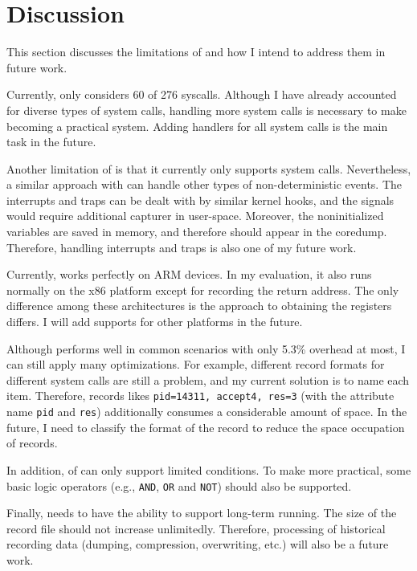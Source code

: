 \section{Discussion} \label{sec:discussion} 

This section discusses the limitations of \TheName and how I intend to address them in future work.

Currently, \TheName only considers 60 of 276 syscalls. Although I have already accounted for diverse types of system calls, handling more system calls is necessary to make \TheName becoming a practical system. Adding handlers for all system calls is the main task in the future.

Another limitation of \TheName is that it currently only supports system calls. Nevertheless, a similar approach with \TheName can handle other types of non-deterministic events. The
interrupts and traps can be dealt with by similar kernel hooks, and the signals
would require additional capturer in user-space. Moreover, the noninitialized variables are saved in memory, and therefore should appear in the coredump. Therefore, handling interrupts and traps is also one of my future work.

Currently, \TheName works perfectly on ARM devices. In my evaluation, it also runs normally on the x86 platform except for recording the return address. The only difference among these architectures is the approach to obtaining the registers differs. I will add supports for other platforms in the future.

Although \TheName performs well in common scenarios with only 5.3\% overhead at most, I can still apply many optimizations. For example, different record formats for different system calls are still a problem, and my current solution is to name each item. Therefore, records likes \texttt{pid=14311, accept4, res=3} (with the attribute name \texttt{pid} and \texttt{res}) additionally consumes a considerable amount of space. In the future, I need to classify the format of the record to reduce the space occupation of records.


In addition, \Filter of \TheName can only support limited conditions. To make \TheName more practical, some basic logic operators (e.g., \texttt{AND}, \texttt{OR} and \texttt{NOT}) should also be supported.

Finally, \TheName needs to have the ability to support long-term running. The size of the record file should not increase unlimitedly. Therefore, processing of historical recording data (dumping, compression, overwriting, etc.) will also be a future work.